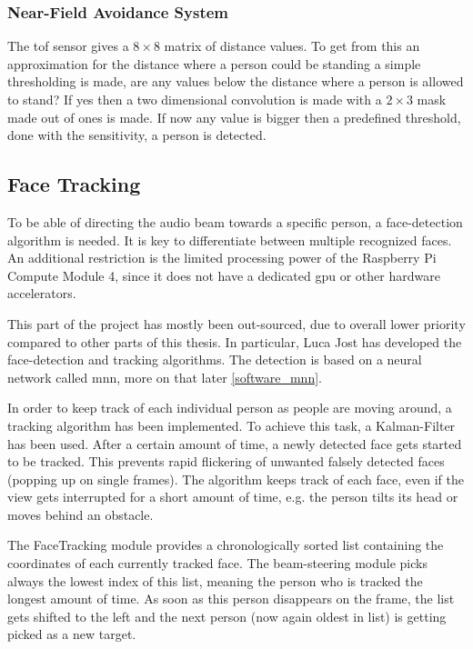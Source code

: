 \subsubsection{Near-Field Avoidance System} \label{4_Sensors_Near-field}
The \acrshort{tof} sensor gives a $8 \times 8$ matrix of distance values. To get from this an approximation for the distance where a person could be standing a simple thresholding is made, are any values below the distance where a person is allowed to stand? If yes then a two dimensional convolution is made with a $2 \times 3$ mask made out of ones is made. If now any value is bigger then a predefined threshold, done with the sensitivity, a person is detected.  

\subsection{Face Tracking}
To be able of directing the audio beam towards a specific person, a face-detection algorithm is needed. It is key to differentiate between multiple recognized faces. An additional restriction is the limited processing power of the Raspberry Pi Compute Module 4, since it does not have a dedicated \acrfull{gpu} or other hardware accelerators.

This part of the project has mostly been out-sourced, due to overall lower priority compared to other parts of this thesis. In particular, Luca Jost has developed the face-detection and tracking algorithms. The detection is based on a neural network called \acrshort{mnn}, more on that later \ref{software_mnn}.

In order to keep track of each individual person as people are moving around, a tracking algorithm has been implemented. To achieve this task, a Kalman-Filter has been used. After a certain amount of time, a newly detected face gets started to be tracked. This prevents rapid flickering of unwanted falsely detected faces (popping up on single frames). The algorithm keeps track of each face, even if the view gets interrupted for a short amount of time, e.g. the person tilts its head or moves behind an obstacle.

The FaceTracking module provides a chronologically sorted list containing the coordinates of each currently tracked face. The beam-steering module picks always the lowest index of this list, meaning the person who is tracked the longest amount of time. As soon as this person disappears on the frame, the list gets shifted to the left and the next person (now again oldest in list) is getting picked as a new target.

